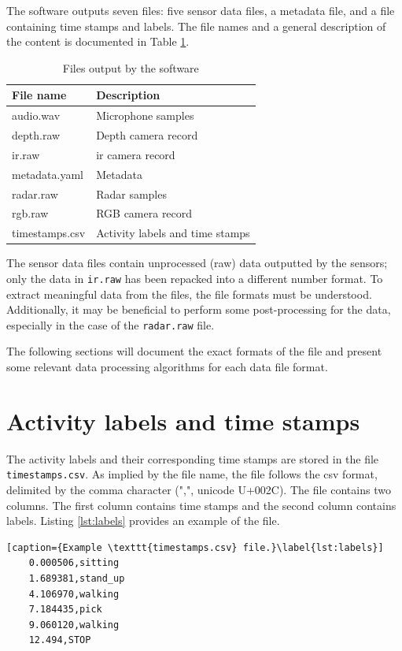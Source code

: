The software outputs seven files: five sensor data files, a metadata file, and a file containing time stamps and labels.
The file names and a general description of the content is documented in Table \ref{tab:3-files}.

\begin{table}[H]
    \centering
    \begin{tabular}{l l}
    \toprule
    \textbf{File name} & \textbf{Description} \\
    \midrule
    audio.wav & Microphone samples \\
    depth.raw & Depth camera record \\
    ir.raw & \gls{ir} camera record \\
    metadata.yaml & Metadata \\
    radar.raw & Radar samples \\
    rgb.raw & RGB camera record \\
    timestamps.csv & Activity labels and time stamps \\
    \bottomrule
    \end{tabular}
    \caption{Files output by the software}
    \label{tab:3-files}
\end{table}

The sensor data files contain unprocessed (raw) data outputted by the sensors;
only the data in \texttt{ir.raw} has been repacked into a different number format.
To extract meaningful data from the files, the file formats must be understood.
Additionally, it may be beneficial to perform some post-processing for the data,
especially in the case of the \texttt{radar.raw} file.

The following sections will document the exact formats of the file
and present some relevant data processing algorithms for each data file format.

\section{Activity labels and time stamps}
The activity labels and their corresponding time stamps are stored in the file \texttt{timestamps.csv}.
As implied by the file name, the file follows the \gls{csv} format, delimited by the comma character (",", unicode U+002C).
The file contains two columns.
The first column contains time stamps and the second column contains labels.
Listing \ref{lst:labels} provides an example of the file.

\begin{lstlisting}[caption={Example \texttt{timestamps.csv} file.}\label{lst:labels}]
    0.000506,sitting
    1.689381,stand_up
    4.106970,walking
    7.184435,pick
    9.060120,walking
    12.494,STOP
\end{lstlisting}

